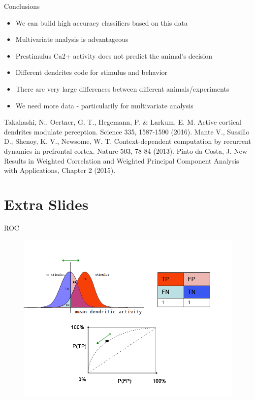 \documentclass[10pt]{beamer}
\begin{document}
\begin{frame}[fragile]{Conclusions}
\begin{itemize}
\item We can build high accuracy classifiers based on this data
\item Multivariate analysis is advantageous
\item Prestimulus Ca2+ activity does not predict the animal's decision
\item Different dendrites code for stimulus and behavior
\item There are very large differences between different animals/experiments
\item We need more data - particularily for multivariate analysis
\end{itemize}
\end{frame}

\begin{frame}
\begin{thebibliography}{9}
 Takahashi, N., Oertner, G. T., Hegemann, P. \& Larkum, E. M. Active cortical dendrites modulate perception. Science 335, 1587-1590 (2016).
 Mante V., Sussillo D., Shenoy, K. V., Newsome, W. T. Context-dependent computation by recurrent dynamics in prefrontal cortex. Nature 503, 78-84 (2013).
 Pinto da Costa, J. New Results in Weighted Correlation and Weighted Principal Component Analysis with Applications, Chapter 2 (2015).
\end{thebibliography}
\end{frame}

\section*{Extra Slides}

\begin{frame}[fragile]{ROC}
\begin{center}
	\begin{figure}
      \includegraphics[width=1.0\textwidth]{roc_exp.png}
	\end{figure}
	\end{center}
\end{frame}
\end{document}
